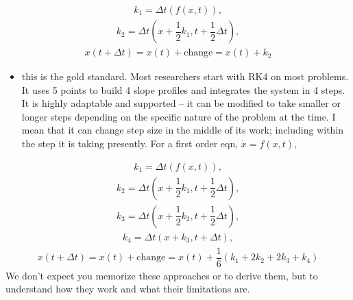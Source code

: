 \documentclass[letterpaper,10pt,english]{jupyterBook}
\begin{document}
\begin{equation*}
\begin{split}k_1 = \Delta t\left(f(x,t)\right),\end{split}
\end{equation*}\begin{equation*}
\begin{split}k_2 =  \Delta t\left(x+\dfrac{1}{2}k_1, t+\dfrac{1}{2}\Delta t\right),\end{split}
\end{equation*}\begin{equation*}
\begin{split}x(t+\Delta t) = x(t) + \textrm{change} = x(t) + k_2\end{split}
\end{equation*}\begin{itemize}
\item {} 
\sphinxAtStartPar
{} \sphinxhyphen{} this is the gold standard. Most researchers start with RK4 on most problems. It uses 5 points to build 4 slope profiles and integrates the system in 4 steps. It is highly adaptable and supported – it can be modified to take smaller or longer steps depending on the specific nature of the problem at the time. I mean that it can change step size in the middle of its work; including within the step it is taking presently. For a first order eqn, \(\dot{x}=f(x,t)\),

\end{itemize}
\begin{equation*}
\begin{split}k_1 = \Delta t\left(f(x,t)\right),\end{split}
\end{equation*}\begin{equation*}
\begin{split}k_2 =  \Delta t\left(x+\dfrac{1}{2}k_1, t+\dfrac{1}{2}\Delta t\right),\end{split}
\end{equation*}\begin{equation*}
\begin{split}k_3 =  \Delta t\left(x+\dfrac{1}{2}k_2, t+\dfrac{1}{2}\Delta t\right),\end{split}
\end{equation*}\begin{equation*}
\begin{split}k_4 =  \Delta t\left(x+k_3, t+\Delta t\right),\end{split}
\end{equation*}\begin{equation*}
\begin{split}x(t+\Delta t) = x(t) + \textrm{change} = x(t) + \dfrac{1}{6}\left(k_1 + 2k_2 +2k_3 +k_4\right)\end{split}
\end{equation*}
\sphinxAtStartPar
We don’t expect you memorize these approaches or to derive them, but to understand how they work and what their limitations are.
\end{document}
